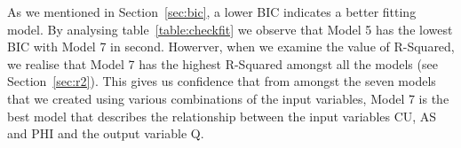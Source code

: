 \documentclass[a4paper,12pt, english]{article}
\begin{document}
As we mentioned in Section~\ref{sec:bic}, a lower BIC indicates a better fitting model. By analysing table~\ref{table:checkfit} we observe that Model 5 has the lowest BIC with Model 7 in second. Howerver, when we examine the value of R-Squared, we realise that Model 7 has the highest R-Squared amongst all the models (see Section~\ref{sec:r2}). This gives us confidence that from amongst the seven models that we created using various combinations of the input variables, Model 7 is the best model that describes the relationship between the input variables CU, AS and PHI and the output variable Q.



\end{document}
